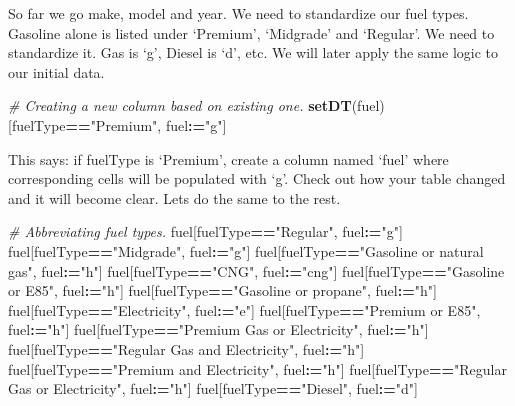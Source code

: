 \documentclass[]{book}
\newenvironment{Shaded}{\begin{snugshade}}{\end{snugshade}}
\newcommand{\CommentTok}[1]{\textcolor[rgb]{0.56,0.35,0.01}{\textit{#1}}}
\newcommand{\ErrorTok}[1]{\textcolor[rgb]{0.64,0.00,0.00}{\textbf{#1}}}
\newcommand{\KeywordTok}[1]{\textcolor[rgb]{0.13,0.29,0.53}{\textbf{#1}}}
\newcommand{\NormalTok}[1]{#1}
\newcommand{\OperatorTok}[1]{\textcolor[rgb]{0.81,0.36,0.00}{\textbf{#1}}}
\newcommand{\StringTok}[1]{\textcolor[rgb]{0.31,0.60,0.02}{#1}}
\begin{document}
So far we go make, model and year. We need to standardize our fuel types. Gasoline alone is listed under `Premium', `Midgrade' and `Regular'. We need to standardize it. Gas is `g', Diesel is `d', etc. We will later apply the same logic to our initial data.

\begin{Shaded}
\begin{Highlighting}[]
\CommentTok{# Creating a new column based on existing one.}
\KeywordTok{setDT}\NormalTok{(fuel)[fuelType}\OperatorTok{==}\StringTok{"Premium"}\NormalTok{, fuel}\OperatorTok{:}\ErrorTok{=}\StringTok{"g"}\NormalTok{]}
\end{Highlighting}
\end{Shaded}

This says: if fuelType is `Premium', create a column named `fuel' where corresponding cells will be populated with `g'. Check out how your table changed and it will become clear. Lets do the same to the rest.

\begin{Shaded}
\begin{Highlighting}[]
\CommentTok{# Abbreviating fuel types.}
\NormalTok{fuel[fuelType}\OperatorTok{==}\StringTok{"Regular"}\NormalTok{, fuel}\OperatorTok{:}\ErrorTok{=}\StringTok{"g"}\NormalTok{]}
\NormalTok{fuel[fuelType}\OperatorTok{==}\StringTok{"Midgrade"}\NormalTok{, fuel}\OperatorTok{:}\ErrorTok{=}\StringTok{"g"}\NormalTok{]}
\NormalTok{fuel[fuelType}\OperatorTok{==}\StringTok{"Gasoline or natural gas"}\NormalTok{, fuel}\OperatorTok{:}\ErrorTok{=}\StringTok{"h"}\NormalTok{]}
\NormalTok{fuel[fuelType}\OperatorTok{==}\StringTok{"CNG"}\NormalTok{, fuel}\OperatorTok{:}\ErrorTok{=}\StringTok{"cng"}\NormalTok{]}
\NormalTok{fuel[fuelType}\OperatorTok{==}\StringTok{"Gasoline or E85"}\NormalTok{, fuel}\OperatorTok{:}\ErrorTok{=}\StringTok{"h"}\NormalTok{]}
\NormalTok{fuel[fuelType}\OperatorTok{==}\StringTok{"Gasoline or propane"}\NormalTok{, fuel}\OperatorTok{:}\ErrorTok{=}\StringTok{"h"}\NormalTok{]}
\NormalTok{fuel[fuelType}\OperatorTok{==}\StringTok{"Electricity"}\NormalTok{, fuel}\OperatorTok{:}\ErrorTok{=}\StringTok{"e"}\NormalTok{]}
\NormalTok{fuel[fuelType}\OperatorTok{==}\StringTok{"Premium or E85"}\NormalTok{, fuel}\OperatorTok{:}\ErrorTok{=}\StringTok{"h"}\NormalTok{]}
\NormalTok{fuel[fuelType}\OperatorTok{==}\StringTok{"Premium Gas or Electricity"}\NormalTok{, fuel}\OperatorTok{:}\ErrorTok{=}\StringTok{"h"}\NormalTok{]}
\NormalTok{fuel[fuelType}\OperatorTok{==}\StringTok{"Regular Gas and Electricity"}\NormalTok{, fuel}\OperatorTok{:}\ErrorTok{=}\StringTok{"h"}\NormalTok{]}
\NormalTok{fuel[fuelType}\OperatorTok{==}\StringTok{"Premium and Electricity"}\NormalTok{, fuel}\OperatorTok{:}\ErrorTok{=}\StringTok{"h"}\NormalTok{]}
\NormalTok{fuel[fuelType}\OperatorTok{==}\StringTok{"Regular Gas or Electricity"}\NormalTok{, fuel}\OperatorTok{:}\ErrorTok{=}\StringTok{"h"}\NormalTok{]}
\NormalTok{fuel[fuelType}\OperatorTok{==}\StringTok{"Diesel"}\NormalTok{, fuel}\OperatorTok{:}\ErrorTok{=}\StringTok{"d"}\NormalTok{]}
\end{Highlighting}
\end{Shaded}
\end{document}
